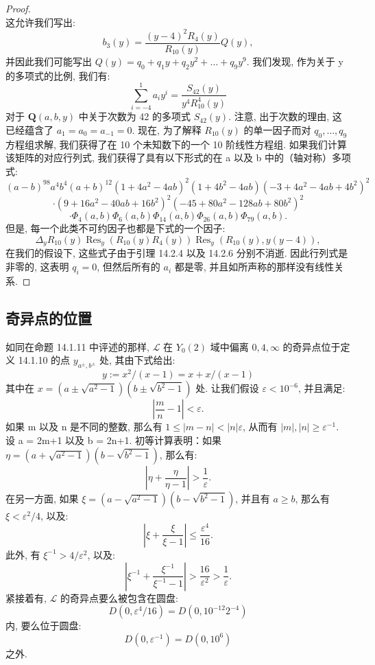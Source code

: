 \begin{proof}
\begin{equation}
\end{equation}
这允许我们写出:
\begin{equation}\label{eq:14.3.5}
b_3(y) = \frac{(y-4)^2 R_4(y)}{R_{10}(y)} Q(y),
\end{equation}
并因此我们可能写出 \(Q(y) = q_0 + q_1 y + q_2 y^2 + \dots + q_9 y^9\). 
我们发现, 作为关于 y 的多项式的比例, 我们有:
\begin{equation}\label{eq:14.3.6}
\sum_{i=-4}^{1} a_i y^i = \frac{S_{42}(y)}{y^4 R_{10}^4(y)}
\end{equation}
对于 \(\mathbf{Q}(a, b, y)\) 中关于次数为 42 的多项式 \(S_{42}(y)\). 
注意, 出于次数的理由, 这已经蕴含了 \(a_1 = a_0 = a_{-1} = 0\). 
现在, 为了解释 \(R_{10}(y)\) 的单一因子而对 \(q_0, \ldots, q_9\) 方程组求解, 
我们获得了在 10 个未知数下的一个 10 阶线性方程组. 
如果我们计算该矩阵的对应行列式, 
我们获得了具有以下形式的在 a 以及 b 中的（轴对称）多项式:
\[ (a-b)^{98}a^4b^4(a+b)^{12}(1+4a^2-4ab)^2(1+4b^2-4ab)(-3+4a^2-4ab+4b^2)^2 \]
\[ \cdot (9+16a^2-40ab+16b^2)^2(-45+80a^2-128ab+80b^2)^2 \]
\[ \cdot \Phi_4(a,b)\Phi_6(a,b)\Phi_{14}(a,b)\Phi_{26}(a,b)\Phi_{79}(a,b). \]
但是, 每一个此类不可约因子也都是下式的一个因子:
\[ \Delta_y R_{10}(y) \operatorname{Res}_y(R_{10}(y) R_4(y)) \operatorname{Res}_y(R_{10}(y), y(y-4)), \]
在我们的假设下, 这些式子由于引理 14.2.4 以及 14.2.6 分别不消逝. 
因此行列式是非零的, 
这表明 \(q_i = 0\), 但然后所有的 \(a_i\) 都是零, 
并且如所声称的那样没有线性关系.
\end{proof}

\subsection{奇异点的位置}\label{sec:14.4}

如同在命题 14.1.11 中评述的那样, 
\(\mathcal{L}\) 在 \(Y_0(2)\) 域中偏离 \(0, 4, \infty\) 的奇异点位于定义 14.1.10 的点 \(y_{a^{\pm}, b^{\pm}}\) 处, 
其由下式给出:
\[ y := x^2/(x-1) = x + x/(x-1) \]
其中在 \(x = \left(a \pm \sqrt{a^2 - 1}\right) \left(b \pm \sqrt{b^2 - 1}\right)\) 处. 
让我们假设 \(\varepsilon < 10^{-6}\), 并且满足:
\[ \left|\frac{m}{n}-1\right|<\varepsilon. \]
如果 m 以及 n 是不同的整数, 那么有 \(1 \leq |m-n| < |n|\varepsilon\), 
从而有 \(|m|, |n| \geq \varepsilon^{-1}\). 
设 a = 2m+1 以及 b = 2n+1. 
初等计算表明：如果 \(\eta = (a+\sqrt{a^2-1})(b-\sqrt{b^2-1})\), 那么有:
\[ \left|\eta + \frac{\eta}{\eta - 1}\right| > \frac{1}{\varepsilon}. \]
在另一方面, 如果 \(\xi = (a - \sqrt{a^2 - 1})(b - \sqrt{b^2 - 1})\), 
并且有 \(a \ge b\), 那么有 \(\xi < \varepsilon^2/4\), 以及:
\[ \left|\xi + \frac{\xi}{\xi - 1}\right| \le \frac{\varepsilon^4}{16}. \]
此外, 有 \(\xi^{-1} > 4/\varepsilon^2\), 以及:
\[ \left|\xi^{-1} + \frac{\xi^{-1}}{\xi^{-1} - 1}\right| > \frac{16}{\varepsilon^2} > \frac{1}{\varepsilon}. \]
紧接着有, \(\mathcal{L}\) 的奇异点要么被包含在圆盘:
\[ D(0, \varepsilon^4/16) = D(0, 10^{-12}2^{-4}) \]
内, 要么位于圆盘:
\[ D(0, \varepsilon^{-1}) = D(0, 10^6) \]
之外.


